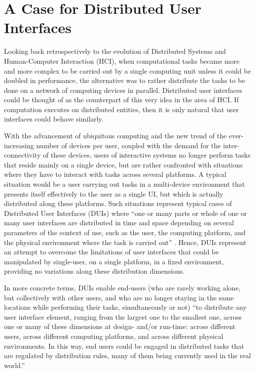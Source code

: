 \section{A Case for Distributed User Interfaces}
Looking back retrospectively to the
evolution of Distributed Systems and Human-Computer Interaction (HCI), when
computational tasks became more and more complex to be carried out by a single computing unit unless it
could be doubled in performance, the alternative was to rather distribute the
tasks to be done on a network of computing devices in parallel. Distributed user interfaces
could be thought of as the counterpart of this very idea in the area of HCI. If
computation executes on distributed entities, then it is only natural that user
interfaces could behave similarly.\par
With the advancement of ubiquitous computing and the new trend of the
ever-increasing number of devices per user, coupled with the demand for
the inter-connectivity of these devices, users of interactive systems no longer
perform tasks that reside mainly on a single device, but are rather confronted with situations where they have to interact with tasks across several
platforms. A typical situation would be a user carrying out tasks in a
multi-device environment that presents itself effectively to the user as a
single UI, but which is actually distributed along these platforms. Such situations
represent typical cases of Distributed User Interfaces (DUIs) where ``one or
many parts or whole of one or many user interfaces are distributed in time and
space depending on several parameters of the context of use, such as the user,
the computing platform, and the physical environment where the task is carried
out'' \cite{demeure20084c}. Hence, DUIs represent an attempt to overcome the
limitations of user interfaces that could be manipulated by single-user, on a
single platform, in a fixed environment, providing no variations along
these distribution dimensions.\par
In more concrete terms, DUIs enable end-users
(who are rarely working alone, but collectively with other users, and who are no
longer staying in the same locations while performing their tasks,
simultaneously or not) ``to distribute any user interface element, ranging from
the largest one to the smallest one, across one or many of these dimensions at
design- and/or run-time: across different users, across different computing
platforms, and across different physical environments. In this way, end users could be engaged in distributed tasks that are regulated by distribution rules, many of them being currently used in the real world.'' \cite{vanderdonckt2010distributed}\par
